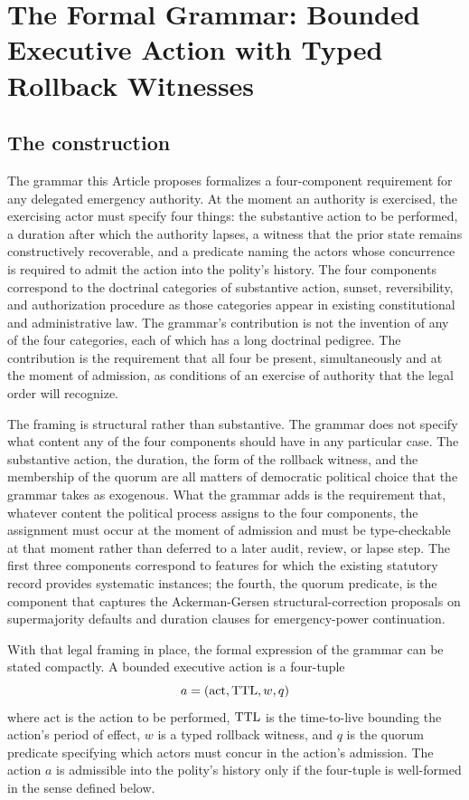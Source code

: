 \section{The Formal Grammar: Bounded Executive Action with Typed Rollback Witnesses}
\label{sec:grammar}

\subsection{The construction}

The grammar this Article proposes formalizes a four-component requirement for any delegated emergency authority.
At the moment an authority is exercised, the exercising actor must specify four things:
the substantive action to be performed,
a duration after which the authority lapses,
a witness that the prior state remains constructively recoverable,
and a predicate naming the actors whose concurrence is required to admit the action into the polity's history.
The four components correspond to the doctrinal categories of substantive action, sunset, reversibility,
and authorization procedure as those categories appear in existing constitutional and administrative law.
The grammar's contribution is not the invention of any of the four categories,
each of which has a long doctrinal pedigree.
The contribution is the requirement that all four be present, simultaneously and at the moment of admission,
as conditions of an exercise of authority that the legal order will recognize.

The framing is structural rather than substantive.
The grammar does not specify what content any of the four components should have in any particular case.
The substantive action, the duration, the form of the rollback witness, and the membership of the quorum
are all matters of democratic political choice that the grammar takes as exogenous.
What the grammar adds is the requirement that, whatever content the political process assigns to the four
components, the assignment must occur at the moment of admission and must be type-checkable at that moment
rather than deferred to a later audit, review, or lapse step.
The first three components correspond to features for which the existing statutory record provides
systematic instances; the fourth, the quorum predicate, is the component that captures the
Ackerman-Gersen structural-correction proposals on supermajority defaults and duration clauses for emergency-power continuation.

With that legal framing in place, the formal expression of the grammar can be stated compactly.
A bounded executive action is a four-tuple
\[
a = (\text{act}, \mathrm{TTL}, w, q)
\]
where $\text{act}$ is the action to be performed, $\mathrm{TTL}$ is the time-to-live bounding the action's
period of effect, $w$ is a typed rollback witness, and $q$ is the quorum predicate specifying which actors
must concur in the action's admission.
The action $a$ is admissible into the polity's history only if the four-tuple is well-formed in the sense
defined below.

